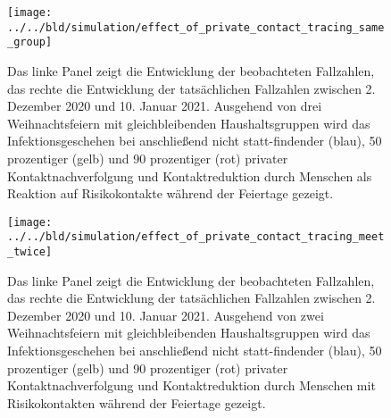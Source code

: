 \documentclass[a4paper,11pt,leqno,fleqn]{article}
\begin{document}
\begin{figure}
\label{fig:effect_of_contact_tracing_with_same_group_christmas}
\texttt{[image: ../../bld/simulation/effect\_of\_private\_contact\_tracing\_same\_group]}
\caption{
    Das linke Panel zeigt die Entwicklung der beobachteten Fallzahlen, das rechte die Entwicklung der tatsächlichen Fallzahlen zwischen 2. Dezember 2020 und 10. Januar 2021. Ausgehend von drei Weihnachtsfeiern mit gleichbleibenden Haushaltsgruppen wird das Infektionsgeschehen bei anschließend nicht statt-findender (blau), 50 prozentiger (gelb) und 90 prozentiger (rot)
    privater Kontaktnachverfolgung und Kontaktreduktion durch Menschen als Reaktion auf  Risikokontakte während der Feiertage gezeigt.
}
\end{figure}


\begin{figure}
\label{fig:effect_of_contact_tracing_with_meet_twice_christmas}
\texttt{[image: ../../bld/simulation/effect\_of\_private\_contact\_tracing\_meet\_twice]}
\caption{
    Das linke Panel zeigt die Entwicklung der beobachteten Fallzahlen, das rechte die Entwicklung der tatsächlichen Fallzahlen zwischen 2. Dezember 2020 und 10. Januar 2021. Ausgehend von zwei Weihnachtsfeiern mit gleichbleibenden Haushaltsgruppen wird das Infektionsgeschehen bei anschließend nicht statt-findender (blau), 50 prozentiger (gelb) und 90 prozentiger (rot)
    privater Kontaktnachverfolgung und Kontaktreduktion durch Menschen mit Risikokontakten
    während der Feiertage gezeigt.
}
\end{figure}
\end{document}
